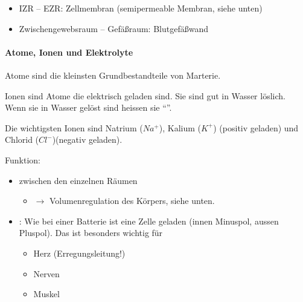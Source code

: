 \begin{itemize}
    \item IZR -- EZR:    Zellmembran (semipermeable Membran, siehe unten)
    \item Zwischengewebsraum -- Gefäßraum:  Blutgefäßwand
\end{itemize}


\paragraph{Atome, Ionen und Elektrolyte}
\label{topic:elektrolyte}

Atome sind die kleinsten Grundbestandteile von Marterie.

Ionen sind Atome die elektrisch geladen sind. Sie sind gut
in Wasser löslich. Wenn sie in Wasser gelöst sind heissen sie
"`"'.


Die wichtigsten Ionen sind Natrium ($Na^+$), Kalium ($K^+$)
(positiv geladen) und Chlorid ($Cl^-$)(negativ geladen). 

Funktion:

\begin{itemize}
    \item {} zwischen den einzelnen Räumen 
    \begin{itemize}
        \item ${\rightarrow}$ Volumenregulation des Körpers, siehe unten.
    \end{itemize}
    \item {}: Wie bei einer Batterie
    ist eine Zelle geladen (innen Minuspol, aussen Pluspol). Das ist besonders wichtig für
    \begin{itemize}
        \item Herz (Erregungsleitung!)
        \item Nerven
        \item Muskel
    \end{itemize}
\end{itemize}




